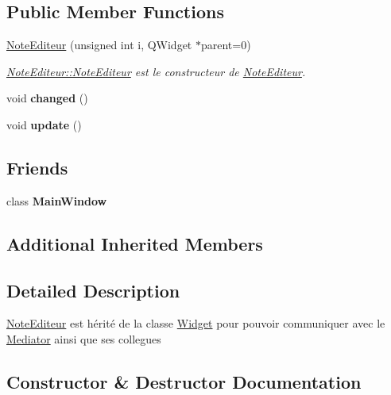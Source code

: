 \subsection*{Public Member Functions}
\begin{DoxyCompactItemize}
\item 
\hyperlink{classNoteEditeur_a1671a54cf740cf1d7625e7e7f6e7939c}{Note\+Editeur} (unsigned int i, Q\+Widget $\ast$parent=0)
\begin{DoxyCompactList}\small\item\em \hyperlink{classNoteEditeur_a1671a54cf740cf1d7625e7e7f6e7939c}{Note\+Editeur\+::\+Note\+Editeur} est le constructeur de \hyperlink{classNoteEditeur}{Note\+Editeur}. \end{DoxyCompactList}\item 
\mbox{\label{classNoteEditeur_a31553ce87020b18a1aa7e7c7992f6b99}} 
void {\bfseries changed} ()
\item 
\mbox{\label{classNoteEditeur_a9f341bb6831b9cef29f56c77e0d64884}} 
void {\bfseries update} ()
\end{DoxyCompactItemize}
\subsection*{Friends}
\begin{DoxyCompactItemize}
\item 
\mbox{\label{classNoteEditeur_af9db4b672c4d3104f5541893e08e1809}} 
class {\bfseries Main\+Window}
\end{DoxyCompactItemize}
\subsection*{Additional Inherited Members}


\subsection{Detailed Description}
\hyperlink{classNoteEditeur}{Note\+Editeur} est hérité de la classe \hyperlink{classWidget}{Widget} pour pouvoir communiquer avec le \hyperlink{classMediator}{Mediator} ainsi que ses collegues 

\subsection{Constructor \& Destructor Documentation}
\mbox{\label{classNoteEditeur_a1671a54cf740cf1d7625e7e7f6e7939c}} 
